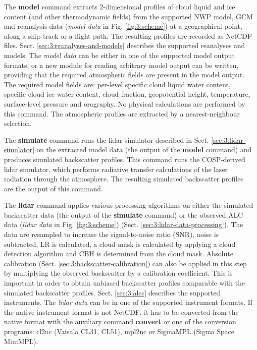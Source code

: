 The \textbf{model}
command extracts 2-dimensional profiles of cloud liquid and ice content
(and other thermodynamic fields) from the supported NWP model, GCM and
reanalysis data (\textit{model data} in Fig. \ref{fig:3:scheme}) at a geographical point, along a ship track or a flight path.
The resulting profiles are recorded as NetCDF files. Sect. \ref{sec:3:reanalyses-and-models}
describes the supported reanalyses and models. The \textit{model data} can
be either in one of the supported model output formats,
or a new module for reading arbitrary model output can be written,
providing that the required atmospheric fields are present in the model output.
The required model fields are: per-level specific cloud liquid water content,
specific cloud ice water content, cloud fraction, geopotential height, temperature,
surface-level pressure and orography. No physical calculations are performed
by this command. The atmospheric profiles are extracted by a nearest-neighbour
selection.

The \textbf{simulate} command runs the lidar simulator described in Sect. \ref{sec:3:lidar-simulator}
on the extracted model data (the output of the \textbf{model} command) and produces simulated backscatter profiles. This command runs the COSP-derived lidar simulator, which performs
radiative transfer calculations of the laser radiation through the atmosphere.
The resulting simulated backscatter profiles are the output of this command.

The \textbf{lidar} command applies various processing algorithms on either
the simulated backscatter data (the output of the \textbf{simulate} command)
or the observed ALC data (\textit{lidar data} in Fig. \ref{fig:3:scheme})
(Sect. \ref{sec:3:lidar-data-processing}). The data are resampled
to increase the signal-to-noise ratio (SNR), noise is subtracted, LR is calculated,
a cloud mask is calculated by applying a cloud detection algorithm and CBH is determined
from the cloud mask. Absolute calibration (Sect. \ref{sec:3:backscatter-calibration})
can also be applied in this step by
multiplying the observed backscatter by a calibration coefficient. This is
important in order to obtain unbiased backscatter profiles comparable with the simulated
backscatter profiles. Sect. \ref{sec:3:alcs} describes the supported instruments.
The \textit{lidar data} can be in one of the supported instrument formats. If
the native instrument format is not NetCDF, it has to be converted from the native
format with the auxiliary command \textbf{convert} or one of the conversion
programs: cl2nc (Vaisala CL31, CL51), mpl2nc or SigmaMPL (Sigma Space MiniMPL).

